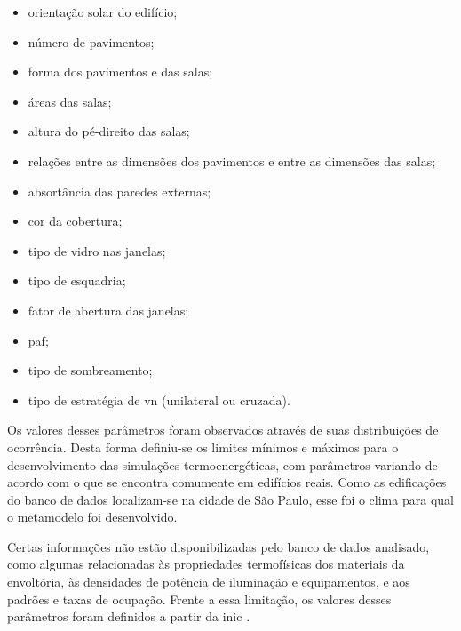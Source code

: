 \documentclass[brazil,hardcopy,openany]{ufscthesis} %
\begin{document}
\begin{itemize}
	\item orientação solar do edifício;
	\item número de pavimentos;
	\item forma dos pavimentos e das salas;
	\item áreas das salas;  %
	\item altura do pé-direito das salas;
	\item relações entre as dimensões dos pavimentos e entre as dimensões das salas;
	\item absortância das paredes externas; %
	\item cor da cobertura;
	\item tipo de vidro nas janelas;
	\item tipo de esquadria;
	\item fator de abertura das janelas;
	\item \acrfull{paf};  %
	\item tipo de sombreamento;  %
	\item tipo de estratégia de \acrlong{vn} (unilateral ou cruzada).
\end{itemize} 

Os valores desses parâmetros foram observados através de suas distribuições de ocorrência. Desta forma definiu-se os limites mínimos e máximos para o desenvolvimento das simulações termoenergéticas, com parâmetros variando de acordo com o que se encontra comumente em edifícios reais. Como as edificações do banco de dados localizam-se na cidade de São Paulo, esse foi o clima para qual o metamodelo foi desenvolvido.

Certas informações não estão disponibilizadas pelo banco de dados analisado, como algumas relacionadas às propriedades termofísicas dos materiais da envoltória, às densidades de potência de iluminação e equipamentos, e aos padrões e taxas de ocupação. Frente a essa limitação, os valores desses parâmetros foram definidos a partir da \acrlong{inic} \cite{INIC}. %
\end{document}

